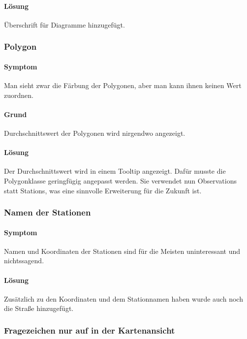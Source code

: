      \paragraph{Lösung}
      Überschrift für Diagramme hinzugefügt.

    \subsubsection*{Polygon}
      \paragraph{Symptom}

      Man sieht zwar die Färbung der Polygonen, aber man kann ihnen keinen Wert zuordnen.


      \paragraph{Grund}
      Durchschnittswert der Polygonen wird nirgendwo angezeigt.

      \paragraph{Lösung}
      Der Durchschnittswert wird in einem Tooltip angezeigt. Dafür musste die Polygonklasse geringfügig
      angepasst werden. Sie verwendet nun Observations statt Stations, was eine sinnvolle Erweiterung für die Zukunft ist.


    \subsubsection*{Namen der Stationen}
      \paragraph{Symptom}

      Namen und Koordinaten der Stationen sind für die Meisten uninteressant und nichtssagend.
      

      \paragraph{Lösung}
      Zusätzlich zu den Koordinaten und dem Stationnamen haben wurde auch noch die Straße hinzugefügt.

    \subsubsection*{Fragezeichen nur auf in der Kartenansicht}
